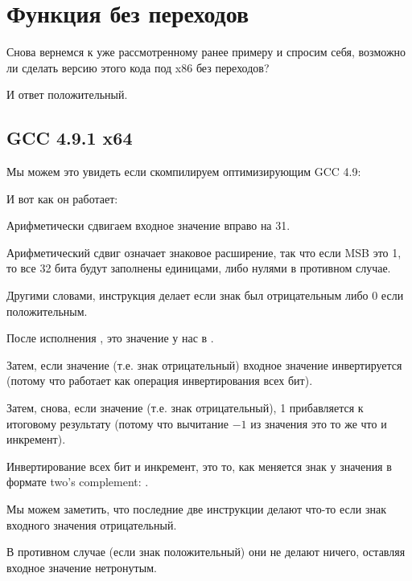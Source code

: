 \section{Функция  без переходов}
\label{chap:branchless_abs}

Снова вернемся к уже рассмотренному ранее примеру  и спросим себя, возможно ли
сделать версию этого кода под x86 без переходов?



И ответ положительный.

\subsection{\Optimizing GCC 4.9.1 x64}

Мы можем это увидеть если скомпилируем оптимизирующим GCC 4.9:



И вот как он работает:

Арифметически сдвигаем входное значение вправо на 31.

Арифметический сдвиг означает знаковое расширение, так что если \ac{MSB} это 1, то все 32 бита будут
заполнены единицами, либо нулями в противном случае.

Другими словами, инструкция  делает  если знак был отрицательным либо 0 если
положительным.

После исполнения , это значение у нас в \EDX.

Затем, если значение  (т.е. знак отрицательный) входное значение инвертируется
(потому что  работает как операция инвертирования всех бит).

Затем, снова, если значение  (т.е. знак отрицательный), 1 прибавляется к итоговому результату
(потому что вычитание $-1$ из значения это то же что и инкремент).

Инвертирование всех бит и инкремент, это то, как меняется знак у значения в формате two's complement: 
.

Мы можем заметить, что последние две инструкции делают что-то если знак входного значения отрицательный.

В противном случае (если знак положительный) они не делают ничего, оставляя входное значение нетронутым.

